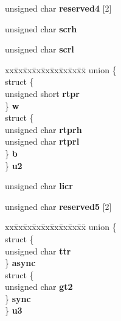 \begin{DoxyCompactItemize}
\begin{tabbing}
\end{tabbing}\item 
\mbox{\label{structcd2401__regs___a3148cd1f87c8769c4cad03b7021ed171}} 
unsigned char {\bfseries reserved4} \mbox{[}2\mbox{]}
\item 
\mbox{\label{structcd2401__regs___a28b88400c1a964cbcc79f347c22748e7}} 
unsigned char {\bfseries scrh}
\item 
\mbox{\label{structcd2401__regs___a96c41ebb8045b45c667921c0a3c3550e}} 
unsigned char {\bfseries scrl}
\item 
\mbox{\label{structcd2401__regs___a41774b2fa25388454538873fb8356a20}} 
\begin{tabbing}
xx\=xx\=xx\=xx\=xx\=xx\=xx\=xx\=xx\=\kill
union \{\\
\>struct \{\\
\>\>unsigned short {\bfseries rtpr}\\
\>\} {\bfseries w}\\
\>struct \{\\
\>\>unsigned char {\bfseries rtprh}\\
\>\>unsigned char {\bfseries rtprl}\\
\>\} {\bfseries b}\\
\} {\bfseries u2}\\

\end{tabbing}\item 
\mbox{\label{structcd2401__regs___a5dbbf4c46a24202331cdc287f1237d1f}} 
unsigned char {\bfseries licr}
\item 
\mbox{\label{structcd2401__regs___afa38d6ca71019c0c0883fe44c902f625}} 
unsigned char {\bfseries reserved5} \mbox{[}2\mbox{]}
\item 
\mbox{\label{structcd2401__regs___a31e5306ac73bd461b4a4e12d997af2d9}} 
\begin{tabbing}
xx\=xx\=xx\=xx\=xx\=xx\=xx\=xx\=xx\=\kill
union \{\\
\>struct \{\\
\>\>unsigned char {\bfseries ttr}\\
\>\} {\bfseries async}\\
\>struct \{\\
\>\>unsigned char {\bfseries gt2}\\
\>\} {\bfseries sync}\\
\} {\bfseries u3}\\


\end{tabbing}
\end{DoxyCompactItemize}
